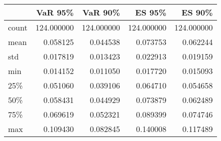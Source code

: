 \begin{tabular}{lrrrr}
\toprule
{} &     VaR 95\% &     VaR 90\% &      ES 95\% &      ES 90\% \\
\midrule
count &  124.000000 &  124.000000 &  124.000000 &  124.000000 \\
mean  &    0.058125 &    0.044538 &    0.073753 &    0.062244 \\
std   &    0.017819 &    0.013423 &    0.022913 &    0.019159 \\
min   &    0.014152 &    0.011050 &    0.017720 &    0.015093 \\
25\%   &    0.051060 &    0.039106 &    0.064710 &    0.054658 \\
50\%   &    0.058431 &    0.044929 &    0.073879 &    0.062489 \\
75\%   &    0.069619 &    0.052321 &    0.089399 &    0.074746 \\
max   &    0.109430 &    0.082845 &    0.140008 &    0.117489 \\
\bottomrule
\end{tabular}
